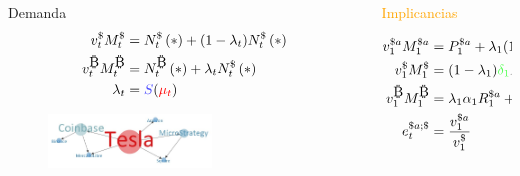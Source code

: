\begin{frame}[plain]
\begin{columns}
\begin{column}{0.50\textwidth}
    \begin{block}{\textcolor{dgreen}{Demanda}}
        \vspace{-10pt}
            \tiny
              \begin{align*}
              v_{t}^{\$}{M_{t}^{\$}}&={N_{t}^{\$}\left(*\right)}+(1-\lambda_t){N_{t}^{\$}\left(*\right)}\\
              v_{t}^{\bitcoinA}{M_{t}^{\bitcoinA}}&={N_{t}^{\bitcoinA}\left(*\right)+\lambda_tN_{t}^{\$}\left(*\right)}\\
              \lambda_t&=\textcolor{blue!70}{S}(\textcolor{red}{\mu_t})
            \end{align*}
    \vspace{-20pt}
            \begin{figure}[t!]
            \begin{center}
            \includegraphics[width=0.6\textwidth]{images/C3/c3_simul_influ3.jpg}
             \end{center}
            \end{figure}
            
    \end{block}
    \end{column}
    
    \begin{column}{0.55\textwidth}
    
    
    \begin{block}{\textcolor{orange}{Implicancias}}
    \tiny

    \begin{align*}
    v^{\$a}_1 M^{\$a}_1&=P_1^{{\$a}} + \lambda_1 (1-\alpha_1) R_1^{{\$a}} + (1-\lambda_1){\rho_1}  R_1^{{\$a}}\\
    v_1^{\$} M_1^{\$}&=(1-\lambda_1) \textcolor{green!70}{\delta_1} R_1^{\$a}\\
    v_1^{\bitcoinA} M_1^{\bitcoinA}&={\lambda_1}  \alpha_1 R_1^{\$a} + (1-\lambda_1){\beta_1} R_1^{\$a}\\
    e_t^{{\$a};{\$}}&=\frac{v_1^{\$a}}{v_1^{\$}}
    \end{align*}
    
    \vspace{-5pt}
    

\end{block}
\end{column}
\end{columns}
\end{frame}
